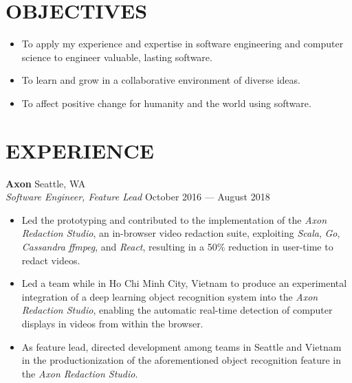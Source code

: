 \documentclass[line,margin]{res}
\begin{document}
\address{wilsoniya@gmail.com}
\address{(312) 404--0425}

\begin{resume}


\section{OBJECTIVES}
    \begin{itemize} \itemsep -2pt
        \item To apply my experience and expertise in software engineering and
            computer science to engineer valuable, lasting software.
        \item To learn and grow in a collaborative environment of diverse
            ideas.
        \item To affect positive change for humanity and the world using
            software.
    \end{itemize}


\section{EXPERIENCE}
    \textbf{Axon} \hfill Seattle, WA \\
    \textit{Software Engineer, Feature Lead}
    \hfill October 2016 --- August 2018
        \begin{itemize}  \itemsep -2pt
            \item Led the prototyping and contributed to the implementation of
                the \textit{Axon Redaction Studio}, an in-browser video
                redaction suite, exploiting \textit{Scala}, \textit{Go},
                \textit{Cassandra} \textit{ffmpeg}, and \textit{React},
                resulting in a 50\% reduction in user-time to redact videos.
            \item Led a team while in Ho Chi Minh City, Vietnam to produce an
                experimental integration of a deep learning object recognition
                system into the \textit{Axon Redaction Studio}, enabling the
                automatic real-time detection of computer displays in videos
                from within the browser.
            \item As feature lead, directed development among teams in Seattle
                and Vietnam in the productionization of the aforementioned
                object recognition feature in the \textit{Axon Redaction
                Studio}.
        \end{itemize}


\end{resume}
\end{document}
